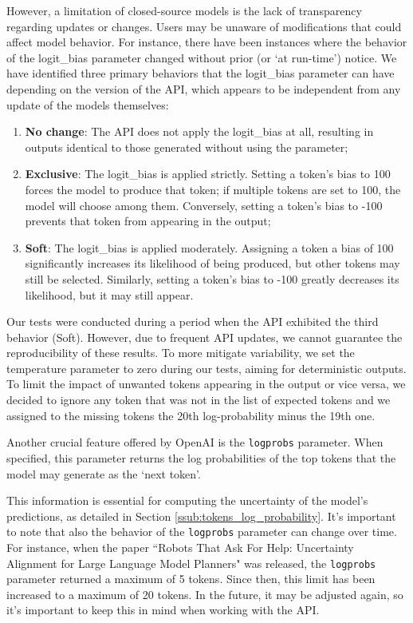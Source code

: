However, a limitation of closed-source models is the lack of transparency
regarding updates or changes. Users may be unaware of modifications that could affect
model behavior. For instance, there have been instances where the behavior of the
logit\_bias parameter changed without prior (or `at run-time') notice. We have
identified three primary behaviors that the logit\_bias parameter can have
depending on the version of the API, which appears to be independent from any update
of the models themselves:
\begin{enumerate}
  \item \textbf{No change}: The API does not apply the logit\_bias at all,
    resulting in outputs identical to those generated without using the
    parameter;

  \item \textbf{Exclusive}: The logit\_bias is applied strictly. Setting a token's
    bias to 100 forces the model to produce that token; if multiple tokens are set
    to 100, the model will choose among them. Conversely, setting a token's bias
    to -100 prevents that token from appearing in the output;

  \item \textbf{Soft}: The logit\_bias is applied moderately. Assigning a token
    a bias of 100 significantly increases its likelihood of being produced, but other
    tokens may still be selected. Similarly, setting a token's bias to -100
    greatly decreases its likelihood, but it may still appear.
\end{enumerate}

Our tests were conducted during a period when the API exhibited the third behavior
(Soft). However, due to frequent API updates, we cannot guarantee the
reproducibility of these results. To more mitigate variability, we set the
temperature parameter to zero during our tests, aiming for deterministic outputs.
To limit the impact of unwanted tokens appearing in the output or vice versa, we
decided to ignore any token that was not in the list of expected tokens and we assigned
to the missing tokens the 20th log-probability minus the 19th one.

Another crucial feature offered by OpenAI is the \texttt{logprobs} parameter. When
specified, this parameter returns the log probabilities of the top tokens that
the model may generate as the `next token'.

This information is essential for computing the uncertainty of the model's
predictions, as detailed in Section \ref{ssub:tokens_log_probability}. It's
important to note that also the behavior of the \texttt{logprobs} parameter can change
over time. For instance, when the paper ``Robots That Ask For Help: Uncertainty
Alignment for Large Language Model Planners" was released, the \texttt{logprobs}
parameter returned a maximum of 5 tokens. Since then, this limit has been increased
to a maximum of 20 tokens. In the future, it may be adjusted again, so it's
important to keep this in mind when working with the API.

